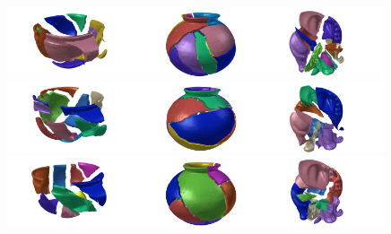 \documentclass[acmlarge,screen]{acmart}
\begin{document}
\begin{figure}[h]
\includegraphics[width=0.33\textwidth]{images/ambercuppuzzle4}\includegraphics[width=0.33\textwidth]{images/saltdeanpuzzle2}\includegraphics[width=0.33\textwidth]{images/elephantpuzzle2}\\
\includegraphics[width=0.33\textwidth]{images/ambercuppuzzle5}\includegraphics[width=0.33\textwidth]{images/saltdeanpuzzle3}\includegraphics[width=0.33\textwidth]{images/elephantpuzzle3}\\
\includegraphics[width=0.33\textwidth]{images/ambercuppuzzle6}\includegraphics[width=0.33\textwidth]{images/saltdeanpuzzle4}\includegraphics[width=0.33\textwidth]{images/elephantpuzzle4}

\end{figure}
\end{document}
